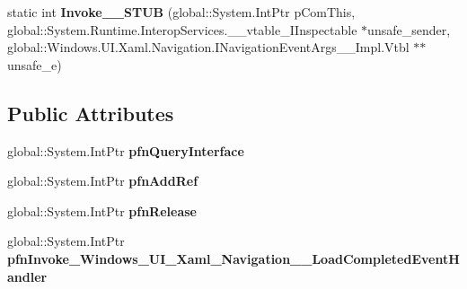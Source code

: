 \begin{DoxyCompactItemize}
\item 
\mbox{\label{struct_windows_1_1_u_i_1_1_xaml_1_1_navigation_1_1_load_completed_event_handler_____impl_1_1_vtbl_a87e8f089c06e28f742080282794a7da7}} 
static int {\bfseries Invoke\+\_\+\+\_\+\+S\+T\+UB} (global\+::\+System.\+Int\+Ptr p\+Com\+This, global\+::\+System.\+Runtime.\+Interop\+Services.\+\_\+\+\_\+vtable\+\_\+\+I\+Inspectable $\ast$unsafe\+\_\+sender, global\+::\+Windows.\+U\+I.\+Xaml.\+Navigation.\+I\+Navigation\+Event\+Args\+\_\+\+\_\+\+Impl.\+Vtbl $\ast$$\ast$unsafe\+\_\+e)
\end{DoxyCompactItemize}
\subsection*{Public Attributes}
\begin{DoxyCompactItemize}
\item 
\mbox{\label{struct_windows_1_1_u_i_1_1_xaml_1_1_navigation_1_1_load_completed_event_handler_____impl_1_1_vtbl_a319e00436ac13a9ba5510a6c6bfda404}} 
global\+::\+System.\+Int\+Ptr {\bfseries pfn\+Query\+Interface}
\item 
\mbox{\label{struct_windows_1_1_u_i_1_1_xaml_1_1_navigation_1_1_load_completed_event_handler_____impl_1_1_vtbl_afcfb3d2d4735a64dfe7b0a39c759ef20}} 
global\+::\+System.\+Int\+Ptr {\bfseries pfn\+Add\+Ref}
\item 
\mbox{\label{struct_windows_1_1_u_i_1_1_xaml_1_1_navigation_1_1_load_completed_event_handler_____impl_1_1_vtbl_aaed82d70aaff7f5c13b4e5b19a8034b9}} 
global\+::\+System.\+Int\+Ptr {\bfseries pfn\+Release}
\item 
\mbox{\label{struct_windows_1_1_u_i_1_1_xaml_1_1_navigation_1_1_load_completed_event_handler_____impl_1_1_vtbl_a48401ab7e2771f3dbe49305a4dfa9bef}} 
global\+::\+System.\+Int\+Ptr {\bfseries pfn\+Invoke\+\_\+\+Windows\+\_\+\+U\+I\+\_\+\+Xaml\+\_\+\+Navigation\+\_\+\+\_\+\+Load\+Completed\+Event\+Handler}
\end{DoxyCompactItemize}
